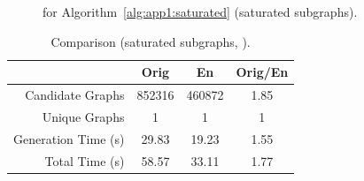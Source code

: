 \begin{figure}[!ht]
\caption{ for Algorithm~\ref{alg:app1:saturated} (saturated subgraphs).}
\end{figure}

\begin{table}[!ht]
\centering
\caption{Comparison (saturated subgraphs, ).\label{tb:app1:saturated-ex2}}
\begin{tabular}{r | c | c | c}
\hline \hline
& Orig & En & Orig/En \\
\hline
Candidate Graphs & 852316 & 460872 & 1.85 \\ 
Unique Graphs & 1 & 1 & 1 \\
Generation Time (s) & 29.83 & 19.23 & 1.55 \\
Total Time (s) & 58.57 & 33.11 & 1.77 \\
\hline \hline
\end{tabular}
\end{table}